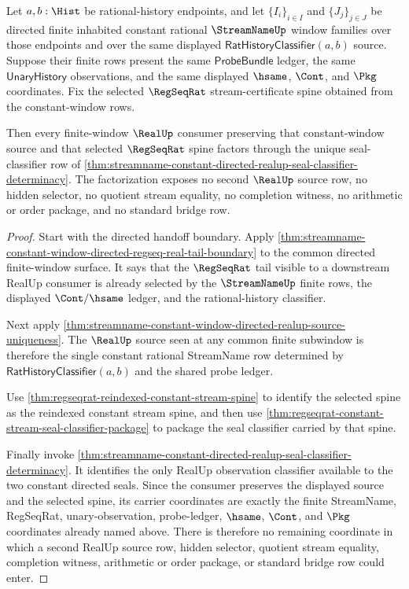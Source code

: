 \begin{theorem}
\label{thm:streamname-constant-directed-realup-seal-terminality}
Let $a,b:\Hist$ be rational-history endpoints, and let
$\{I_i\}_{i\in I}$ and $\{J_j\}_{j\in J}$ be directed finite inhabited
constant rational $\StreamNameUp$ window families over those endpoints and over
the same displayed $\mathsf{RatHistoryClassifier}(a,b)$ source. Suppose their
finite rows present the same $\mathsf{ProbeBundle}$ ledger, the same
$\mathsf{UnaryHistory}$ observations, and the same displayed $\hsame$, $\Cont$,
and $\Pkg$ coordinates. Fix the selected $\RegSeqRat$ stream-certificate spine
obtained from the constant-window rows.

Then every finite-window $\RealUp$ consumer preserving that constant-window
source and that selected $\RegSeqRat$ spine factors through the unique
seal-classifier row of
\autoref{thm:streamname-constant-directed-realup-seal-classifier-determinacy}.
The factorization exposes no second $\RealUp$ source row, no hidden selector,
no quotient stream equality, no completion witness, no arithmetic or order
package, and no standard bridge row.
\end{theorem}
\begin{proof}
Start with the directed handoff boundary. Apply
\autoref{thm:streamname-constant-window-directed-regseq-real-tail-boundary} to
the common directed finite-window surface. It says that the $\RegSeqRat$ tail
visible to a downstream RealUp consumer is already selected by the
$\StreamNameUp$ finite rows, the displayed $\Cont/\hsame$ ledger, and the
rational-history classifier.

Next apply
\autoref{thm:streamname-constant-window-directed-realup-source-uniqueness}.
The $\RealUp$ source seen at any common finite subwindow is therefore the single
constant rational StreamName row determined by
$\mathsf{RatHistoryClassifier}(a,b)$ and the shared probe ledger.

Use \autoref{thm:regseqrat-reindexed-constant-stream-spine} to identify the
selected spine as the reindexed constant stream spine, and then use
\autoref{thm:regseqrat-constant-stream-seal-classifier-package} to package the
seal classifier carried by that spine.

Finally invoke
\autoref{thm:streamname-constant-directed-realup-seal-classifier-determinacy}.
It identifies the only RealUp observation classifier available to the two
constant directed seals. Since the consumer preserves the displayed source and
the selected spine, its carrier coordinates are exactly the finite StreamName,
RegSeqRat, unary-observation, probe-ledger, $\hsame$, $\Cont$, and $\Pkg$
coordinates already named above. There is therefore no remaining coordinate in
which a second RealUp source row, hidden selector, quotient stream equality,
completion witness, arithmetic or order package, or standard bridge row could
enter.
\end{proof}
